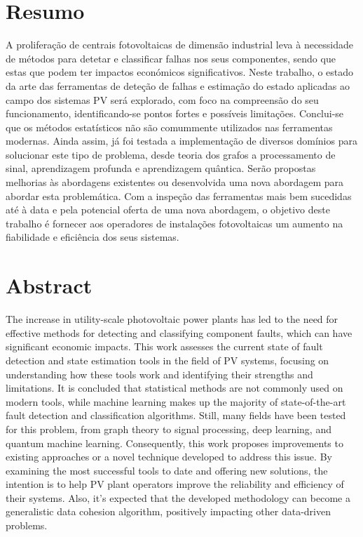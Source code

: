 \chapter*{Resumo}

A proliferação de centrais fotovoltaicas de dimensão industrial leva à necessidade de métodos para detetar e classificar falhas nos seus componentes, sendo que estas que podem ter impactos económicos significativos. Neste trabalho, o estado da arte das ferramentas de deteção de falhas e estimação do estado aplicadas ao campo dos sistemas PV será explorado, com foco na compreensão do seu funcionamento, identificando-se pontos fortes e possíveis limitações. Conclui-se que os métodos estatísticos não são comummente utilizados nas ferramentas modernas. Ainda assim, já foi testada a implementação de diversos domínios para solucionar este tipo de problema, desde teoria dos grafos a processamento de sinal, aprendizagem profunda e aprendizagem quântica. Serão propostas melhorias às abordagens existentes ou desenvolvida uma nova abordagem para abordar esta problemática. Com a inspeção das ferramentas mais bem sucedidas até à data e pela potencial oferta de uma nova abordagem, o objetivo deste trabalho é fornecer aos operadores de instalações fotovoltaicas um aumento na fiabilidade e eficiência dos seus sistemas.


\chapter*{Abstract}

The increase in utility-scale photovoltaic power plants has led to the need for effective methods for detecting and classifying component faults, which can have significant economic impacts. This work assesses the current state of fault detection and state estimation tools in the field of PV systems, focusing on understanding how these tools work and identifying their strengths and limitations. It is concluded that statistical methods are not commonly used on modern tools, while machine learning makes up the majority of state-of-the-art fault detection and classification algorithms. Still, many fields have been tested for this problem, from graph theory to signal processing, deep learning, and quantum machine learning. Consequently, this work proposes improvements to existing approaches or a novel technique developed to address this issue. By examining the most successful tools to date and offering new solutions, the intention is to help PV plant operators improve the reliability and efficiency of their systems. Also, it's expected that the developed methodology can become a generalistic data cohesion algorithm, positively impacting other data-driven problems.